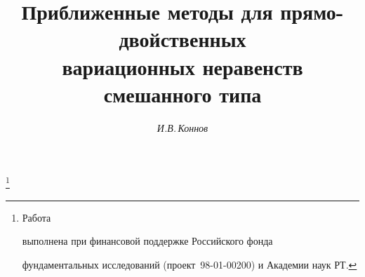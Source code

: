 




%


\newcommand{\tts}[1]{}







\setcounter{page}{55}















\author{\it И.В.\,Коннов}




\title{Приближенные методы для прямо-двойственных\\


вариационных неравенств смешанного типа}


\thanks{Работа 


выполнена при финансовой поддержке Российского фонда


фундаментальных исследований (проект \No\,98-01-00200) и Академии наук РТ.}





\date{}




\pagestyle{plain} %







\maketitle



